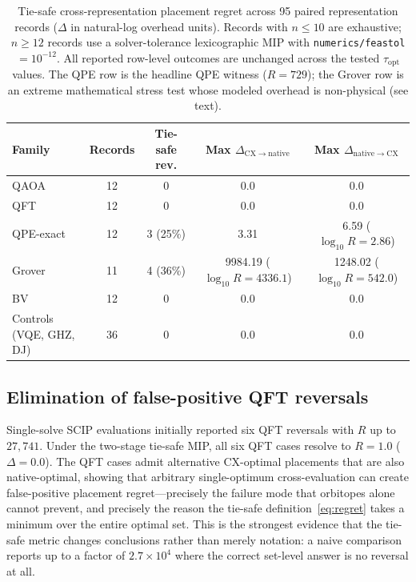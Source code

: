 \documentclass[
  aps,
  pra,
  reprint,
  amsmath,
  amssymb,
  longbibliography,
  nofootinbib,
  floatfix
]{revtex4-2}
\theoremstyle{plain}
\newcommand{\tabfitstar}[1]{{\footnotesize #1}}
\begin{document}
\begin{table}[tp]
\centering
\caption{Tie-safe cross-representation placement regret across 95 paired representation records ($\Delta$ in natural-log overhead units). Records with $n\le10$ are exhaustive; $n\ge12$ records use a solver-tolerance lexicographic MIP with \texttt{numerics/feastol}$=10^{-12}$. All reported row-level outcomes are unchanged across the tested $\tau_{\mathrm{opt}}$ values. The QPE row is the headline QPE witness ($R=729$); the Grover row is an extreme mathematical stress test whose modeled overhead is non-physical (see text).}
\label{tab:e12_regret}
\tabfitstar{%
\begin{tabular}{lcccc}
\toprule
\textbf{Family} & \textbf{Records} & \textbf{Tie-safe rev.} & \textbf{Max $\Delta_{\mathrm{CX}\to\mathrm{native}}$} & \textbf{Max $\Delta_{\mathrm{native}\to\mathrm{CX}}$}\\
\midrule
QAOA          & 12 & 0 & 0.0 & 0.0\\
QFT           & 12 & 0 & 0.0 & 0.0\\
QPE-exact     & 12 & 3 (25\%) & 3.31 & 6.59 ($\log_{10}\!R\!=\!2.86$)\\
Grover        & 11 & 4 (36\%) & 9984.19 ($\log_{10}\!R\!=\!4336.1$) & 1248.02 ($\log_{10}\!R\!=\!542.0$)\\
BV            & 12 & 0 & 0.0 & 0.0\\
Controls (VQE, GHZ, DJ) & 36 & 0 & 0.0 & 0.0\\
\bottomrule
\end{tabular}
}
\end{table}

\subsection{Elimination of false-positive QFT reversals}
\label{sec:results-qft}

Single-solve SCIP evaluations initially reported six QFT reversals with $R$ up to $27{,}741$. Under the two-stage tie-safe MIP, all six QFT cases resolve to $R=1.0$ ($\Delta=0.0$). The QFT cases admit alternative CX-optimal placements that are also native-optimal, showing that arbitrary single-optimum cross-evaluation can create false-positive placement regret---precisely the failure mode that orbitopes alone cannot prevent, and precisely the reason the tie-safe definition~\eqref{eq:regret} takes a minimum over the entire optimal set. This is the strongest evidence that the tie-safe metric changes conclusions rather than merely notation: a naive comparison reports up to a factor of $2.7\times10^4$ where the correct set-level answer is no reversal at all.
\end{document}
